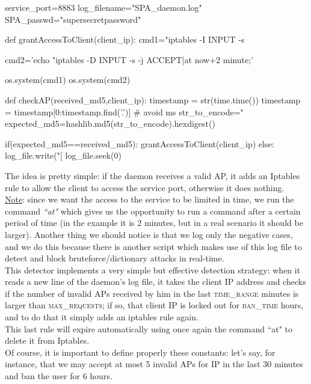 \documentclass[12pt]{report}
\begin{document}
{{\begin{python}
service_port=8883
log_filename="SPA_daemon.log"
SPA_passwd="supersecretpassword"

def grantAccessToClient(client_ip):
	cmd1="iptables -I INPUT -s %
	
	cmd2='echo "iptables -D INPUT -s %
				-j ACCEPT|at now+2 minute;' %
				
	os.system(cmd1)
	os.system(cmd2)			        												 
				        												 
			       																							  
def checkAP(received_md5,client_ip):
	timestamp = str(time.time())
	timestamp = timestamp[0:timestamp.find('.')] # avoid ms
	str_to_encode="%
	expected_md5=hashlib.md5(str_to_encode).hexdigest()

	if(expected_md5==received_md5):
		grantAccessToClient(client_ip)
	else:
		log_file.write("[%
		log_file.seek(0)
	
\end{python}
\bigskip

The idea is pretty simple: if the daemon receives a valid AP, it adds an Iptables rule to allow the client to access the service port, otherwise it does nothing.\\
\underline{Note}: since we want the access to the service to be limited in time, we run the command \emph{``at"} which gives us the opportunity to run a command after a certain period of time (in the example it is 2 minutes, but in a real scenario it should be larger). Another thing we should notice is that we log only the negative cases, and we do this because there is another script which makes use of this log file to detect and block bruteforce/dictionary attacks in real-time.\\

This detector implements a very simple but effective detection strategy: when it reads a new line of the daemon's log file, it takes the client IP address and checks if the number of invalid APs received by him in the last \textsc{time\_range} minutes is larger than \textsc{max\_requests}; if so, that client IP is locked out for \textsc{ban\_time} hours, and to do that it simply adds an iptables rule again.\\
This last rule will expire automatically using once again the command ``at" to delete it from Iptables.\\
Of course, it is important to define properly these constants: let's say, for instance, that we may accept at most 5 invalid APs for IP in the last 30 minutes and ban the user for 6 hours.\\

}}
\end{document}
